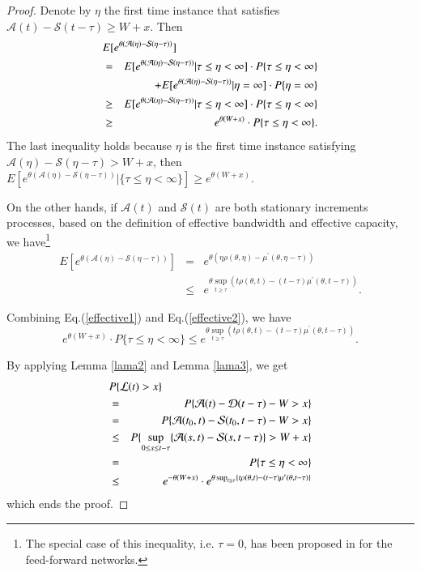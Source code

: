 \documentclass[paper]{ieice}
\newtheorem{proof}{Proof}
\begin{document}
\begin{proof}
Denote by $\eta$ the first time instance that satisfies $\mathcal{A}(t)-\mathcal{S}(t-\tau)\geq W+x$. Then
\begin{eqnarray}\label{effective1}
  \lefteqn{E[e^{\theta(\mathcal{A}(\eta)-\mathcal{S}(\eta-\tau))}]}\nonumber\\
  &=&E[e^{\theta(\mathcal{A}(\eta)-\mathcal{S}(\eta-\tau))}|\tau\leq\eta<\infty]\cdot P\{\tau\leq \eta<\infty\}\nonumber\\
  &&+E[e^{\theta(\mathcal{A}(\eta)-\mathcal{S}(\eta-\tau))}|\eta=\infty]\cdot P\{\eta=\infty\}\nonumber\\
  &\geq& E[e^{\theta(\mathcal{A}(\eta)-\mathcal{S}(\eta-\tau))}|\tau\leq\eta<\infty]\cdot P\{\tau\leq \eta<\infty\}\nonumber\\
  &\geq& e^{\theta (W+x)}\cdot P\{\tau\leq \eta<\infty\}.
\end{eqnarray}
The last inequality holds because $\eta$ is the first time instance satisfying $\mathcal{A}(\eta)-\mathcal{S}(\eta-\tau)>W+x$, then
$E[e^{\theta(\mathcal{A}(\eta)-\mathcal{S}(\eta-\tau))}|\{\tau\leq\eta<\infty\}]\geq e^{\theta (W+x)}$.

On the other hands, if $\mathcal{A}(t)$ and $\mathcal{S}(t)$ are both stationary increments processes, based on the definition of effective bandwidth and effective capacity, we have\footnote{The special case of this inequality, i.e. $\tau=0$, has been proposed in \cite{5984844} for the feed-forward networks.}
\begin{eqnarray}\label{effective2}
E[e^{\theta(\mathcal{A}(\eta)-\mathcal{S}(\eta-\tau))}]&=&e^{\theta(\eta\rho(\theta,\eta)-\mu^\prime(\theta,\eta-\tau))}\nonumber\\
&\leq& e^{\theta\sup_{t\geq \tau}(t\rho(\theta,t)-(t-\tau)\mu^\prime(\theta,t-\tau))}.
\end{eqnarray}

Combining Eq.(\ref{effective1}) and Eq.(\ref{effective2}), we have
$$e^{\theta (W+x)}\cdot P\{\tau\leq\eta<\infty\}\leq e^{\theta\sup_{t\geq \tau}(t\rho(\theta,t)-(t-\tau)\mu^\prime(\theta,t-\tau))}.$$

By applying Lemma \ref{lama2} and Lemma \ref{lama3}, we get
\begin{eqnarray*}
\lefteqn{P\{\mathcal{L}(t)>x\}}\\
&=&P\{\mathcal{A}(t)-\mathcal{D}(t-\tau)-W>x\}\\
&=&P\{\mathcal{A}(t_0,t)-\mathcal{S}(t_0,t-\tau)-W>x\}\\
&\leq&P\{\sup_{0\leq s\leq t-\tau}\{\mathcal{A}(s,t)-\mathcal{S}(s,t-\tau)\}>W+x\}\\
&=&P\{\tau\leq \eta<\infty\}\\
&\leq& e^{-\theta (W+x)}\cdot e^{\theta\sup_{t\geq \tau}\{t\rho(\theta,t)-(t-\tau)\mu^\prime(\theta,t-\tau)\}}
\end{eqnarray*}
which ends the proof.\QED
\end{proof}
\end{document}
